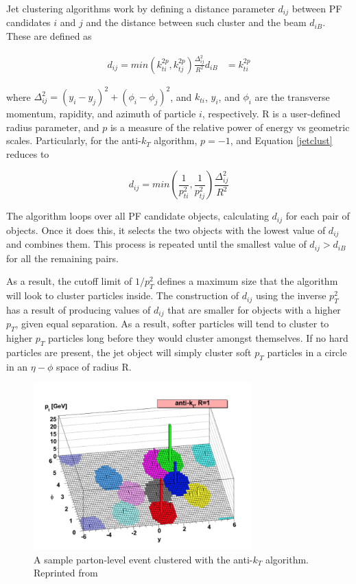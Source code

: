  Jet clustering algorithms work by defining a distance parameter $d_{ij}$ between PF candidates $i$ and $j$ and the distance between such cluster and the beam $d_{iB}$. These are defined as

 \begin{align}
 \label{jetclust}
 d_{ij} = min(k_{ti}^{2p},k_{tj}^{2p})\frac{\Delta_{ij}^{2}}{R^{2}}
 d_{iB} &= k_{ti}^{2p}
 \end{align}

where $\Delta_{ij}^{2} = (y_{i}-y_{j})^{2}+(\phi_{i}-\phi_{j})^{2}$, and $k_{ti}$, $y_{i}$, and $\phi_{i}$ are the transverse momentum, rapidity, and azimuth of particle $i$, respectively. R is a user-defined radius parameter, and $p$ is a measure of the relative power of energy vs geometric scales. Particularly, for the anti-$k_{T}$ algorithm, $p=-1$, and Equation \ref{jetclust} reduces to

\begin{equation}
d_{ij} = min(\frac{1}{p_{ti}^{2}},\frac{1}{p_{tj}^{2}})\frac{\Delta_{ij}^{2}}{R^{2}}
\end{equation}

The algorithm loops over all PF candidate objects, calculating $d_{ij}$ for each pair of objects. Once it does this, it selects the two objects with the lowest value of $d_{ij}$ and combines them. This process is repeated until the smallest value of $d_{ij}>d_{iB}$ for all the remaining pairs. 

As a result, the cutoff limit of $1/p_{T}^{2}$ defines a maximum size that the algorithm will look to cluster particles inside. The construction of $d_{ij}$ using the inverse $p_{T}^{2}$ has a result of producing values of $d_{ij}$ that are smaller for objects with a higher $p_{T}$, given equal separation. As a result, softer particles will tend to cluster to higher $p_{T}$ particles long before they would cluster amongst themselves. If no hard particles are present, the jet object will simply cluster soft $p_{T}$ particles in a circle in an $\eta-\phi$ space of radius R.

\begin{figure}[h]
  	\label{fig:antikt}
 	\centering
 	\includegraphics[width=0.75\textwidth]{figures/antikt.png}
 	\singlespace
 	\caption{A sample parton-level event clustered with the anti-$k_{T}$ algorithm. Reprinted from \cite{Cacciari:2008gp}}
\end{figure}

